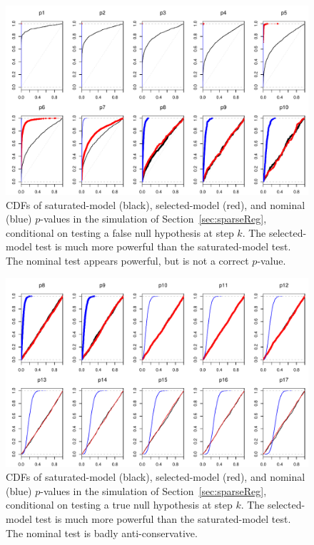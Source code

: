 \documentclass{article}
\begin{document}
\begin{figure}
  \centering
  \includegraphics[width=.8\textwidth]{figs/simulation_snr_5_alpha_05_null_false.pdf}
  \caption{CDFs of saturated-model (black), selected-model (red), and nominal (blue) $p$-values in the simulation of Section~\ref{sec:sparseReg}, conditional on testing a false null hypothesis at step $k$. The selected-model test is much more powerful than the saturated-model test. The nominal test appears powerful, but is not a correct $p$-value.}
  \label{fig:simulation_null_false}
\end{figure}

\begin{figure}
  \centering
  \includegraphics[width=.8\textwidth]{figs/simulation_snr_5_alpha_05_null_true.pdf}
  \caption{CDFs of saturated-model (black), selected-model (red), and nominal (blue) $p$-values in the simulation of Section~\ref{sec:sparseReg}, conditional on testing a true null hypothesis at step $k$. The selected-model test is much more powerful than the saturated-model test. The nominal test is badly anti-conservative.}
  \label{fig:simulation_null_true}
\end{figure}
\end{document}
